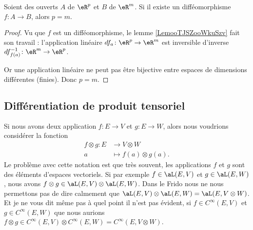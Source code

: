 \begin{proposition}     \label{PROPooNONAooCyAtce}
	Soient des ouverts \( A\) de \( \eR^p\) et \( B\) de \( \eR^m\). Si il existe un difféomorphisme \( f\colon A\to B\), alors \( p=m\).
\end{proposition}

\begin{proof}
	Vu que \( f\) est un difféomorphisme, le lemme \ref{LemooTJSZooWkuSzv} fait son travail : l'application linéaire \( df_a\colon \eR^p\to \eR^m\) est inversible d'inverse \( df^{-1}_{f(a)}\colon \eR^m\to \eR^p\).

	Or une application linéaire ne peut pas être bijective entre espaces de dimensions différentes (finies). Donc \( p=m\).
\end{proof}

\subsection{Différentiation de produit tensoriel}

Si nous avons deux application \( f\colon E\to V\) et \( g\colon E\to W\), alors nous voudrions considérer la fonction
\begin{equation}
	\begin{aligned}
		f\otimes g\colon E & \to V\otimes W            \\
		a                  & \mapsto f(a)\otimes g(a).
	\end{aligned}
\end{equation}
Le problème avec cette notation est que très souvent, les applications \( f\) et \( g\) sont des éléments d'espaces vectoriels. Si par exemple \( f\in \aL(E,V)\) et \( g\in \aL(E,W)\), nous avons \( f\otimes g\in \aL(E,V)\otimes \aL(E,W)\). Dans le Frido nous ne nous permettons pas de dire calmement que \( \aL(E,V)\otimes \aL(E,W)=\aL(E,V\otimes W)\). Et je ne vous dit même pas à quel point il n'est pas évident, si \( f\in C^{\infty}(E,V)\) et \( g\in  C^{\infty}(E,W)\) que nous aurions \( f\otimes g\in C^{\infty}(E,V)\otimes  C^{\infty}(E,W)= C^{\infty}(E,V\otimes W)\).

